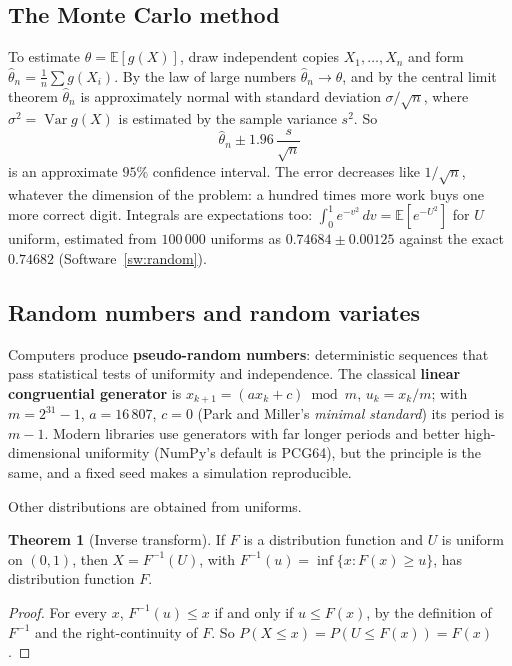 \documentclass[11pt,a4paper]{article}
\numberwithin{equation}{section}
\theoremstyle{definition}
\newtheorem{thm}{Theorem}[subsection]
\begin{document}
\subsection{The Monte Carlo method}
\label{ssec:montecarlo}

To estimate $\theta = \mathbb E[g(X)]$, draw independent copies $X_1, \ldots, X_n$ and form $\hat\theta_n = \frac1n\sum g(X_i)$. By the law of large numbers $\hat\theta_n \to \theta$, and by the central limit theorem $\hat\theta_n$ is approximately normal with standard deviation $\sigma/\sqrt n$, where $\sigma^2 = \operatorname{Var}g(X)$ is estimated
by the sample variance $s^2$. So
\[
\hat\theta_n \pm 1.96\,\frac s{\sqrt n}
\]
is an approximate $95\%$ confidence interval. The error decreases like $1/\sqrt n$, whatever the dimension of the problem: a hundred times more work buys one more correct digit. Integrals are expectations too: $\int_0^1e^{-v^2}\,dv = \mathbb E[e^{-U^2}]$ for $U$ uniform, estimated from $100\,000$ uniforms as $0.74684 \pm 0.00125$ against the exact
$0.74682$ (Software~\ref{sw:random}).

\subsection{Random numbers and random variates}
\label{ssec:variates}

Computers produce \textbf{pseudo-random numbers}: deterministic sequences that pass statistical tests of uniformity and independence. The classical \textbf{linear congruential generator} is $x_{k + 1} = (ax_k + c) \bmod m$, $u_k = x_k/m$; with $m = 2^{31} - 1$, $a = 16\,807$, $c = 0$ (Park and Miller's \emph{minimal standard}) its period is
$m - 1$. Modern libraries use generators with far longer periods and better high-dimensional uniformity (NumPy's default is PCG64), but the principle is the same, and a fixed seed makes a simulation reproducible.

Other distributions are obtained from uniforms.

\begin{thm}[Inverse transform]
\label{thm:inverse}
If $F$ is a distribution function and $U$ is uniform on $(0, 1)$, then $X = F^{-1}(U)$, with $F^{-1}(u) = \inf\{x : F(x) \geq u\}$, has distribution function $F$.
\end{thm}

\begin{proof}
For every $x$, $F^{-1}(u) \leq x$ if and only if $u \leq F(x)$, by the definition of $F^{-1}$ and the right-continuity of $F$. So $P(X \leq x) = P(U \leq F(x)) = F(x)$.
\end{proof}
\end{document}

